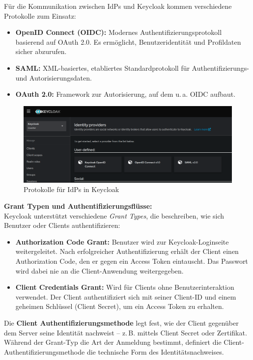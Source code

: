 \documentclass[a4paper,12pt]{article}
\begin{document}
	Für die Kommunikation zwischen IdPs und Keycloak kommen verschiedene Protokolle zum Einsatz:
	\begin{itemize}
		\item \textbf{OpenID Connect (OIDC):} Modernes Authentifizierungsprotokoll basierend auf OAuth 2.0. Es ermöglicht, Benutzeridentität und Profildaten sicher abzurufen.
		\item \textbf{SAML:} XML-basiertes, etabliertes Standardprotokoll für Authentifizierungs- und Autorisierungsdaten.
		\item \textbf{OAuth 2.0:} Framework zur Autorisierung, auf dem u.\,a. OIDC aufbaut.
	\end{itemize}
	
	\begin{figure}[H]
		\centering
		\includegraphics[width=0.9\linewidth]{screenshot007}
		\caption{Protokolle für IdPs in Keycloak}
		\label{fig:screenshot007}
	\end{figure}
	
	\vspace{0.5em}
	\textbf{Grant Typen und Authentifizierungsflüsse:}\\
	Keycloak unterstützt verschiedene \textit{Grant Types}, die beschreiben, wie sich Benutzer oder Clients authentifizieren:
	
	\begin{itemize}
		\item \textbf{Authorization Code Grant:} Benutzer wird zur Keycloak-Loginseite weitergeleitet. Nach erfolgreicher Authentifizierung erhält der Client einen Authorization Code, den er gegen ein Access Token eintauscht. Das Passwort wird dabei nie an die Client-Anwendung weitergegeben.
		\item \textbf{Client Credentials Grant:} Wird für Clients ohne Benutzerinteraktion verwendet. Der Client authentifiziert sich mit seiner Client-ID und einem geheimen Schlüssel (Client Secret), um ein Access Token zu erhalten.
	\end{itemize}
	
	Die \textbf{Client Authentifizierungsmethode} legt fest, wie der Client gegenüber dem Server seine Identität nachweist – z.\,B. mittels Client Secret oder Zertifikat. Während der Grant-Typ die Art der Anmeldung bestimmt, definiert die Client-Authentifizierungsmethode die technische Form des Identitätsnachweises.
	
\end{document}

